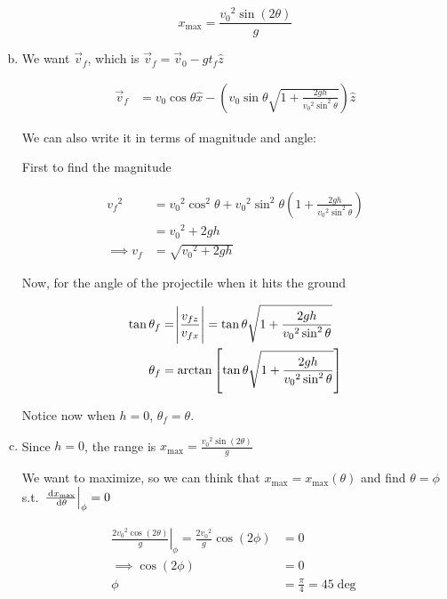 \begin{sol}
\begin{enumerate}[a)]
		\begin{equation}
			x_\mathrm{max} = \frac{{v_0}^2 \sin(2\theta)}{g}
		\end{equation}

		\item We want $\vec v_f$, which is $\vec v_f = \vec v_0 - gt_f \hat z$
		
		\begin{align}
			\vec v_f &= v_0\cos\theta\hat x - \left(v_0\sin\theta \sqrt{1 + \frac{2gh}{{v_0}^2\sin^2\theta}}\right) \hat z
		\end{align}

		We can also write it in terms of magnitude and angle:

		First to find the magnitude

		\begin{align}
			{v_f}^2 &= {v_0}^2\cos^2\theta + {v_0}^2\sin^2\theta \left(1 + \frac{2gh}{{v_0}^2\sin^2\theta}\right)\\
			&= {v_0}^2 + 2gh\\
			\implies v_f &= \sqrt{{v_0}^2 + 2gh}
		\end{align}

		Now, for the angle of the projectile when it hits the ground

		\begin{align}
			\tan\theta_f &= \abs{\frac{v_{fz}}{v_{fx}}} = \tan\theta\sqrt{1 + \frac{2gh}{{v_0}^2\sin^2\theta}}\\
			\theta_f &= \arctan\left[\tan\theta \sqrt{1 + \frac{2gh}{{v_0}^2\sin^2\theta}}\right]
		\end{align}

		\begin{remark}
			Notice now when $h = 0$, $\theta_f = \theta$.
		\end{remark}

		\item Since $h = 0$, the range is $x_\mathrm{max} = \frac{{v_0}^2\sin(2\theta)}{g}$
		
		We want to maximize, so we can think that $x_\mathrm{max} = x_\mathrm{max}(\theta)$ and find $\theta = \phi$ s.t. $\left.\frac{\D x_\mathrm{max}}{\D \theta} \right|_\phi = 0$

		\begin{align}
			\left.\frac{2{v_0}^2 \cos(2\theta)}{g}\right|_\phi = \frac{2{v_0}^2}{g}\cos(2\phi) &= 0\\
			\implies \cos(2\phi) &= 0\\
			\phi &= \frac{\pi}{4} = 45\deg
		\end{align}
	\end{enumerate}
\end{sol}

